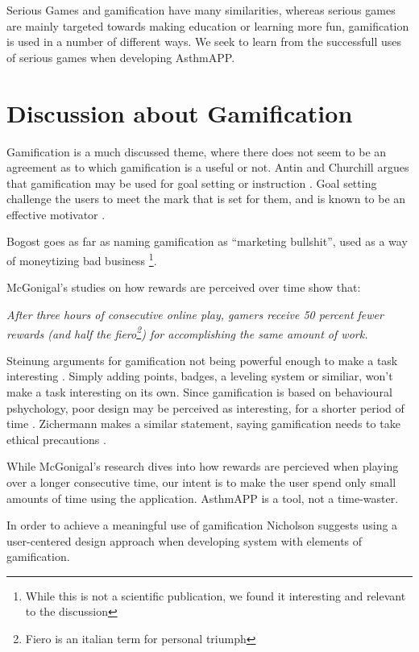 Serious Games and gamification have many similarities, whereas serious games are mainly targeted towards making education or learning more fun, gamification is used in a number of different ways. We seek to learn from the successfull uses of serious games when developing AsthmAPP.


\section{Discussion about Gamification}
\label{sec:gamificationdiscussion}

Gamification is a much discussed theme, where there does not seem to be an agreement as to which gamification is a useful or not. 
Antin and Churchill argues that gamification may be used for goal setting or instruction \cite{antin2011badges}. Goal setting challenge the users to meet the mark that is set for them, and is known to be an effective motivator \cite{ling2005using}. 

Bogost goes as far as naming gamification as ``marketing bullshit'', used as a way of moneytizing bad business \cite{gamificationbullshit}\footnote{While this is not a scientific publication, we found it interesting and relevant to the discussion}.

McGonigal's studies on how rewards are perceived over time show that: 

\textit{After three hours of consecutive online play, gamers receive 50 percent fewer rewards (and half the fiero\footnote{Fiero is an italian term for personal triumph\cite{ekman2007emotions}}) for accomplishing the same amount of work.} \cite{jane2011reality}

Steinung arguments for gamification not being powerful enough to make a task interesting \cite{steinung2012interessante}. Simply adding points, badges, a leveling system or similiar, won't make a task interesting on its own. Since gamification is based on behavioural pshychology, poor design may be perceived as interesting, for a shorter period of time \cite{steinung2012interessante}. Zichermann makes a similar statement, saying gamification needs to take ethical precautions \cite{zichermann2011gamification}.

While McGonigal's research dives into how rewards are percieved when playing over a longer consecutive time, our intent is to make the user spend only small amounts of time using the application. AsthmAPP is a tool, not a time-waster.

In order to achieve a meaningful use of gamification Nicholson\cite{nicholson2012user} suggests using a user-centered design approach\cite{usercentereddesign} when developing system with elements of gamification. 


